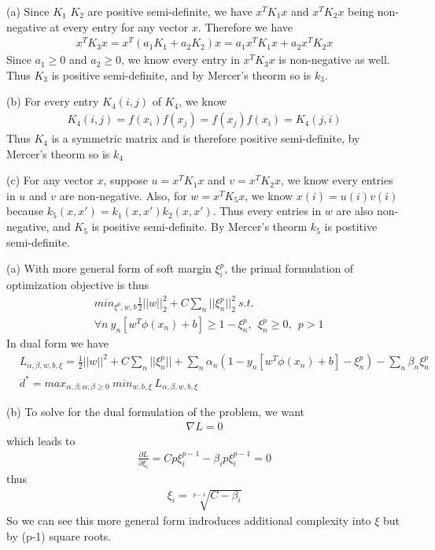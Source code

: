\documentclass[12pt]{article}
\newenvironment{problem}[2][Problem]{\begin{trivlist}
\item[\hskip \labelsep {\bfseries #1}\hskip \labelsep {\bfseries #2}]}{\end{trivlist}}
\begin{document}
\begin{problem}{3. Kernels}
\item{(a)}
Since $K_1$ $K_2$ are positive semi-definite, we have $x^TK_1x$ and $x^TK_2x$ being non-negative at every entry for any vector $x$. Therefore we have
\begin{align*}
x^TK_3x = x^T(a_1K_1 + a_2K_2)x = a_1x^TK_1x + a_2x^TK_2x
\end{align*}
Since $a_1 \geq 0$ and $a_2 \geq 0$, we know every entry in $x^TK_3x$ is non-negative as well. Thus $K_3$ is positive semi-definite, and by Mercer's theorm so is $k_3$.
\\
\item{(b)} 
For every entry $K_4(i, j)$ of $K_4$, we know
\begin{align*}
K_4(i, j) = f(x_i)f(x_j) = f(x_j)f(x_i) = K_4(j, i)
\end{align*}
Thus $K_4$ is a symmetric matrix and is therefore positive semi-definite, by Mercer's theorm so is $k_4$
\item{(c)}
For any vector $x$, suppose $u = x^TK_1x$ and $v = x^TK_2x$, we know every entries in $u$ and $v$ are non-negative. Also, for $w = x^TK_5x$, we know $x(i) = u(i)v(i)$ because $k_5(x, x') = k_1(x, x')k_2(x, x')$. Thus every entries in $w$ are also non-negative, and $K_5$ is positive semi-definite. By Mercer's theorm $k_5$ is postitive semi-definite.
\end{problem}

\begin{problem}{4. Soft Margin Hyperplanes}
\item{(a)} With more general form of soft margin $\xi_i^p$, the primal formulation of optimization objective is thus
\begin{align*}
	&min_{\xi^p, w, b} \frac{1}{2}||w||_2^2 + C\sum_n||\xi_n^p||_2^2 \ s.t.\\
	&\forall n \ y_n[w^T\phi(x_n)+b] \geq 1 - \xi_n^p, \ \ \xi_n^p \geq 0, \ \ p > 1
\end{align*}
In dual form we have
\begin{align*}
	&L_{\alpha, \beta, w, b, \xi} = \frac{1}{2}||w||^2 + C\sum_n||\xi_n^p|| + \sum_n\alpha_n(1-y_n[w^T\phi(x_n)+b]-\xi_n^p) - \sum_n\beta_n\xi_n^p\\
	&d^* = max_{\alpha, \beta; \alpha, \beta \geq 0} \ min_{w, b, \xi} \ L_{\alpha, \beta, w, b, \xi}
\end{align*}
\item{(b)}
To solve for the dual formulation of the problem, we want
\begin{align*}
	\nabla L = 0
\end{align*}
which leads to
\begin{align*}
	\frac{\partial L}{\partial \xi_i} = Cp\xi_i^{p-1} - \beta_i p\xi_i^{p-1} = 0
\end{align*}
thus
\begin{align*}
	\xi_i = \sqrt[p-1]{C-\beta_i}
\end{align*}
So we can see this more general form indroduces additional complexity into $\xi$ but by (p-1) square roots.
\end{problem}
\end{document}
